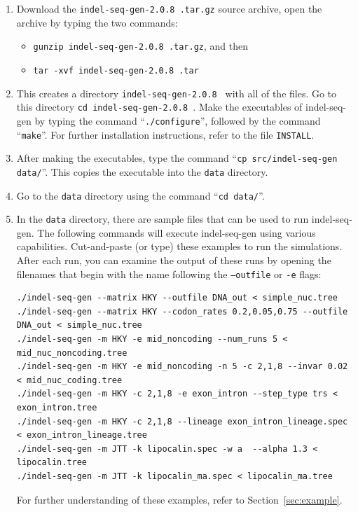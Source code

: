 \documentclass[10pt]{article}
\newcommand{\version}{2.0.8 }
\newcommand{\iSGcurrent}{indel-seq-gen-\version }
\newcommand{\iSGcurrentshort}{iSGv\version }
\begin{document}
\begin{enumerate}
\item Download the {\tt \iSGcurrent.tar.gz} source archive, open the archive by typing the two commands:
 \begin{itemize}
 \item[] {\tt gunzip \iSGcurrent.tar.gz}, and then
 \item[] {\tt tar -xvf \iSGcurrent.tar}
 \end{itemize}
\item This creates a directory {\tt \iSGcurrent} with all of the files.  Go to this directory {\tt cd \iSGcurrent}. Make the executables of indel-seq-gen by typing the command ``{\tt ./configure}'', followed by the command ``{\tt make}''. For further installation instructions, refer to the file {\tt INSTALL}.
\item After making the executables, type the command ``{\tt cp src/indel-seq-gen data/}''. This copies the executable into the {\tt data} directory.
\item Go to the {\tt data} directory using the command ``{\tt cd data/}''.
\item In the {\tt data} directory, there are sample files that can be used to run indel-seq-gen. The following commands will execute indel-seq-gen using various capabilities. Cut-and-paste (or type) these examples to run the simulations. After each run, you can examine the output of these runs by opening the filenames that begin with the name following the {\tt --outfile} or {\tt -e} flags:
\begin{verbatim}
./indel-seq-gen --matrix HKY --outfile DNA_out < simple_nuc.tree
./indel-seq-gen --matrix HKY --codon_rates 0.2,0.05,0.75 --outfile DNA_out < simple_nuc.tree
./indel-seq-gen -m HKY -e mid_noncoding --num_runs 5 < mid_nuc_noncoding.tree
./indel-seq-gen -m HKY -e mid_noncoding -n 5 -c 2,1,8 --invar 0.02 < mid_nuc_coding.tree
./indel-seq-gen -m HKY -c 2,1,8 -e exon_intron --step_type trs < exon_intron.tree
./indel-seq-gen -m HKY -c 2,1,8 --lineage exon_intron_lineage.spec < exon_intron_lineage.tree
./indel-seq-gen -m JTT -k lipocalin.spec -w a  --alpha 1.3 < lipocalin.tree
./indel-seq-gen -m JTT -k lipocalin_ma.spec < lipocalin_ma.tree
\end{verbatim}
 For further understanding of these examples, refer to Section~\ref{sec:example}.

\end{enumerate}
\end{document}

